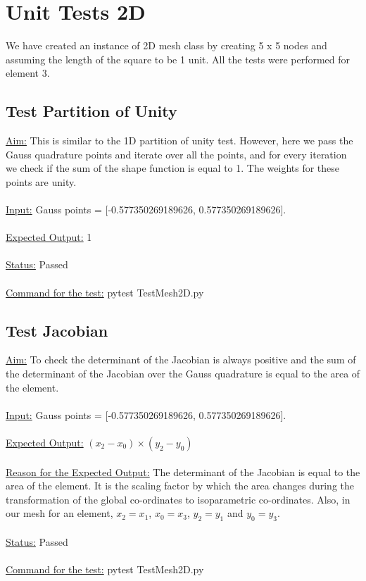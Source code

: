 \section{Unit Tests 2D}
We have created an instance of 2D mesh class by creating 5 x 5 nodes and assuming the length of the square to be 1 unit. All the tests were performed for element 3. 
\subsection{Test Partition of Unity}
\underline{Aim:} This is similar to the 1D partition of unity test. However, here we pass the Gauss quadrature points and iterate over all the points, and  for every iteration we check if the sum of the shape function is equal to 1. The weights for these points are unity.\\ \\
\noindent \underline{Input:} Gauss points = [-0.577350269189626, 0.577350269189626].\\ \\
\underline{Expected Output:} 1\\ \\
\underline{Status:} Passed\\ \\
\noindent \underline{Command for the test:} pytest Test\textunderscore Mesh\textunderscore 2D.py\\

\subsection{Test Jacobian}
\underline{Aim:} To check the determinant of the Jacobian is always positive and the sum of the determinant of the Jacobian over the Gauss quadrature is equal to the area of the element.\\ \\
\noindent \underline{Input:} Gauss points = [-0.577350269189626, 0.577350269189626].\\ \\
\underline{Expected Output:} $(x_2-x_0) \times (y_2-y_0)$ \\ \\
\underline{Reason for the Expected Output:} The determinant of the Jacobian is equal to the area of the element. It is the scaling factor by which the area changes during the transformation of the global co-ordinates to isoparametric co-ordinates. Also, in our mesh for an element, $x_2 = x_1$, $x_0 = x_3$, $y_2 = y_1$ and $y_0 = y_3$.\\ \\
\underline{Status:} Passed\\ \\
\noindent \underline{Command for the test:} pytest Test\textunderscore Mesh\textunderscore 2D.py\\

